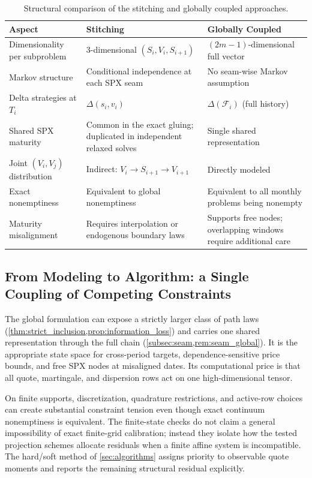 \documentclass{article}
\newcommand{\cF}{\mathcal{F}}
\begin{document}
\begin{table}[ht]
\centering
\caption{Structural comparison of the stitching and globally coupled approaches.}
\label{tab:comparison}
\small
\begin{tabular}{@{}p{4.2cm}p{4.8cm}p{4.8cm}@{}}
\toprule
\textbf{Aspect} & \textbf{Stitching} & \textbf{Globally Coupled} \\
\midrule
Dimensionality per subproblem & 3-dimensional $(S_i, V_i, S_{i+1})$ & $(2m{-}1)$-dimensional full vector \\
\addlinespace
Markov structure & Conditional independence at each SPX seam & No seam-wise Markov assumption \\
\addlinespace
Delta strategies at $T_i$ & $\Delta(s_i, v_i)$ & $\Delta(\cF_i)$ (full history) \\
\addlinespace
Shared SPX maturity & Common in the exact gluing; duplicated in independent relaxed solves & Single shared representation \\
\addlinespace
Joint $(V_i, V_j)$ distribution & Indirect: $V_i \to S_{i+1} \to V_{i+1}$ & Directly modeled \\
\addlinespace
Exact nonemptiness & Equivalent to global nonemptiness & Equivalent to all monthly problems being nonempty \\
\addlinespace
Maturity misalignment & Requires interpolation or endogenous boundary laws & Supports free nodes; overlapping windows require additional care \\
\bottomrule
\end{tabular}
\end{table}

\subsection{From Modeling to Algorithm: a Single Coupling of Competing Constraints}\label{subsec:handoff}

The global formulation can expose a strictly larger class of path laws (\cref{thm:strict_inclusion,prop:information_loss}) and carries one shared representation through the full chain (\cref{subsec:seam,rem:seam_global}).
It is the appropriate state space for cross-period targets, dependence-sensitive price bounds, and free SPX nodes at misaligned dates.
Its computational price is that all quote, martingale, and dispersion rows act on one high-dimensional tensor.

On finite supports, discretization, quadrature restrictions, and active-row choices can create substantial constraint tension even though exact continuum nonemptiness is equivalent.
The finite-state checks do not claim a general impossibility of exact finite-grid calibration; instead they isolate how the tested projection schemes allocate residuals when a finite affine system is incompatible.
The hard/soft method of \cref{sec:algorithms} assigns priority to observable quote moments and reports the remaining structural residual explicitly.
\end{document}
